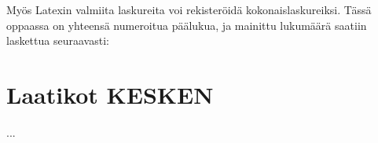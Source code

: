 Myös Latexin valmiita laskureita voi rekisteröidä kokonaislaskureiksi.
Tässä oppaassa on yhteensä  numeroitua päälukua, ja
mainittu lukumäärä saatiin laskettua seuraavasti:

\begin{koodilohkosis}
\end{koodilohkosis}

\section{Laatikot KESKEN}
\label{luku/laatikot}

...

